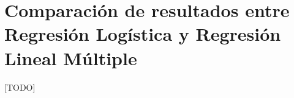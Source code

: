\documentclass{article}
\begin{document}
	\section{Comparación de resultados entre Regresión Logística y Regresión Lineal Múltiple}
	\label{sec:e2}

		\paragraph{}
		[TODO]


	\nocite{garciparedes:machine-learning-regression}
	\nocite{subject:taa}
	\nocite{tool:weka}
  
  
\end{document}
